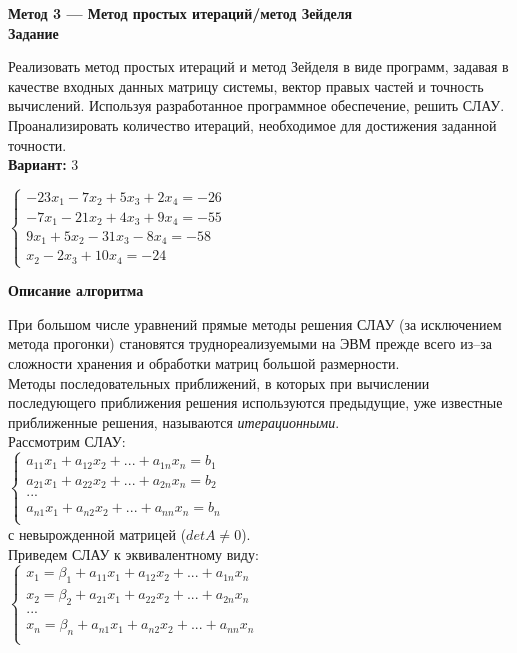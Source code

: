 \textbf{Метод 3 --- Метод простых итераций/метод Зейделя}\\

\textbf{Задание}

Реализовать метод простых итераций и метод Зейделя в виде программ, задавая в качестве входных данных матрицу системы, вектор правых частей и точность вычислений. Используя разработанное программное обеспечение, решить СЛАУ. Проанализировать количество итераций, необходимое для достижения заданной точности.\\

\textbf{Вариант:} 3

$
\begin{cases}
-23x_1-7x_2+5x_3+2x_4=-26\\
-7x_1-21x_2+4x_3+9x_4=-55\\
9x_1+5x_2-31x_3-8x_4=-58\\
x_2-2x_3+10x_4=-24
\end{cases}
$
\vspace{0.5cm}

\textbf{Описание алгоритма}

При большом числе уравнений прямые методы решения СЛАУ  (за исключением метода прогонки) становятся труднореализуемыми на ЭВМ прежде всего из--за сложности хранения и обработки матриц большой размерности.\\

Методы последовательных приближений, в которых при вычислении последующего приближения решения используются предыдущие, уже известные приближенные решения, называются \textit{итерационными}.\\

Рассмотрим СЛАУ:\\

$
\begin{cases}
a_{11}x_1+a_{12}x_2+...+a_{1n}x_n=b_1\\
a_{21}x_1+a_{22}x_2+...+a_{2n}x_n=b_2\\
...\\
a_{n1}x_1+a_{n2}x_2+...+a_{nn}x_n=b_n\\
\end{cases}
$\\

с невырожденной матрицей ($det A \neq 0$).\\

Приведем СЛАУ к эквивалентному виду:\\

$
\begin{cases}
x_1=\beta_1+a_{11}x_1+a_{12}x_2+...+a_{1n}x_n\\
x_2=\beta_2+a_{21}x_1+a_{22}x_2+...+a_{2n}x_n\\
...\\
x_n=\beta_n+a_{n1}x_1+a_{n2}x_2+...+a_{nn}x_n\\
\end{cases}
$\\

